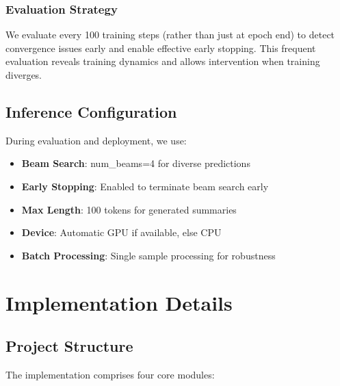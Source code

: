 \documentclass[12pt,a4paper,oneside]{report}
\begin{document}
\subsection{Evaluation Strategy}
We evaluate every 100 training steps (rather than just at epoch end) to detect convergence issues early and enable effective early stopping. This frequent evaluation reveals training dynamics and allows intervention when training diverges.

\section{Inference Configuration}
During evaluation and deployment, we use:
\begin{itemize}
    \item \textbf{Beam Search}: num\_beams=4 for diverse predictions
    \item \textbf{Early Stopping}: Enabled to terminate beam search early
    \item \textbf{Max Length}: 100 tokens for generated summaries
    \item \textbf{Device}: Automatic GPU if available, else CPU
    \item \textbf{Batch Processing}: Single sample processing for robustness
\end{itemize}

\chapter{Implementation Details}
\label{ch:implementation}

\section{Project Structure}
The implementation comprises four core modules:
\end{document}
